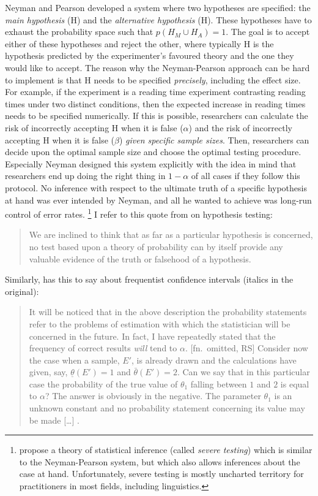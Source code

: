 Neyman and Pearson developed a system where two hypotheses are specified:
the \textit{main hypothesis} (H) and the \textit{alternative hypothesis} (H).
These hypotheses have to exhaust the probability space such that $p(H_M\cup H_A)=1$.
The goal is to accept either of these hypotheses and reject the other, where typically H is the hypothesis predicted by the experimenter's favoured theory and the one they would like to accept.
The reason why the Neyman-Pearson approach can be hard to implement is that H needs to be specified \textit{precisely}, \ie including the effect size.
For example, if the experiment is a reading time experiment contrasting reading times under two distinct conditions, then the expected increase in reading times needs to be specified numerically.
If this is possible, researchers can calculate the risk of incorrectly accepting H when it is false ($\alpha$) and the risk of incorrectly accepting H when it is false ($\beta$) \textit{given specific sample sizes}.
Then, researchers can decide upon the optimal sample size and choose the optimal testing procedure.
Especially Neyman designed this system explicitly with the idea in mind that researchers end up doing the right thing in $1-\alpha$ of all cases if they follow this protocol.
No inference with respect to the ultimate truth of a specific hypothesis at hand was ever intended by Neyman, and all he wanted to achieve was long-run control of error rates.%
\footnote{\citet{Mayo1996,MayoSpanos2004,MayoEa2009,Mayo2018} propose a theory of statistical inference (called \textit{severe testing}) which is similar to the Neyman-Pearson system, but which also allows inferences about the case at hand.
Unfortunately, severe testing is mostly uncharted territory for practitioners in most fields, including linguistics.}
I refer to this quote from \citet[290-291]{NeymanPearson1933} on hypothesis testing:

\begin{quote}
  We are inclined to think that as far as a particular hypothesis is concerned, no test based upon a theory of probability can by itself provide any valuable evidence of the truth or falsehood of a hypothesis.
\end{quote}

Similarly, \citet[349]{Neyman1937} has this to say about frequentist confidence intervals (italics in the original):

\begin{quote} 
  It will be noticed that in the above description the probability statements refer to the problems of estimation with which the statistician will be concerned in the future.
  In fact, I have repeatedly stated that the frequency of correct results \textit{will} tend to $\alpha$. [fn.\ omitted, RS]
  Consider now the case when a sample, $E'$, is already drawn and the calculations have given, say, $\underline{\theta}(E')=1$ and $\bar{\theta}(E')=2$.
  Can we say that in this particular case the probability of the true value of $\theta_1$ falling between $1$ and $2$ is equal to $\alpha$?
  The answer is obviously in the negative.
  The parameter $\theta_1$ is an unknown constant and no probability statement concerning its value may be made [\ldots] .
\end{quote}

